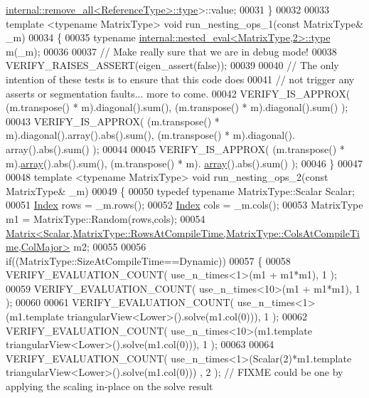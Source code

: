 \begin{DoxyCode}
      \hyperlink{group___sparse_core___module}{internal::remove\_all<ReferenceType>::type}>::value;
00031 \}
00032 
00033 \textcolor{keyword}{template} <\textcolor{keyword}{typename} MatrixType> \textcolor{keywordtype}{void} run\_nesting\_ops\_1(\textcolor{keyword}{const} MatrixType& \_m)
00034 \{
00035   \textcolor{keyword}{typename} \hyperlink{class_eigen_1_1internal_1_1_tensor_lazy_evaluator_writable}{internal::nested\_eval<MatrixType,2>::type} m(\_m);
00036 
00037   \textcolor{comment}{// Make really sure that we are in debug mode!}
00038   VERIFY\_RAISES\_ASSERT(eigen\_assert(\textcolor{keyword}{false}));
00039 
00040   \textcolor{comment}{// The only intention of these tests is to ensure that this code does}
00041   \textcolor{comment}{// not trigger any asserts or segmentation faults... more to come.}
00042   VERIFY\_IS\_APPROX( (m.transpose() * m).diagonal().sum(), (m.transpose() * m).diagonal().sum() );
00043   VERIFY\_IS\_APPROX( (m.transpose() * m).diagonal().array().abs().sum(), (m.transpose() * m).diagonal().
      array().abs().sum() );
00044 
00045   VERIFY\_IS\_APPROX( (m.transpose() * m).\hyperlink{class_eigen_1_1array}{array}().abs().sum(), (m.transpose() * m).
      \hyperlink{class_eigen_1_1array}{array}().abs().sum() );
00046 \}
00047 
00048 \textcolor{keyword}{template} <\textcolor{keyword}{typename} MatrixType> \textcolor{keywordtype}{void} run\_nesting\_ops\_2(\textcolor{keyword}{const} MatrixType& \_m)
00049 \{
00050   \textcolor{keyword}{typedef} \textcolor{keyword}{typename} MatrixType::Scalar Scalar;
00051   \hyperlink{namespace_eigen_a62e77e0933482dafde8fe197d9a2cfde}{Index} rows = \_m.rows();
00052   \hyperlink{namespace_eigen_a62e77e0933482dafde8fe197d9a2cfde}{Index} cols = \_m.cols();
00053   MatrixType m1 = MatrixType::Random(rows,cols);
00054   
      \hyperlink{group___core___module_class_eigen_1_1_matrix}{Matrix<Scalar,MatrixType::RowsAtCompileTime,MatrixType::ColsAtCompileTime,ColMajor>}
       m2;
00055 
00056   \textcolor{keywordflow}{if}((MatrixType::SizeAtCompileTime==Dynamic))
00057   \{
00058     VERIFY\_EVALUATION\_COUNT( use\_n\_times<1>(m1 + m1*m1), 1 );
00059     VERIFY\_EVALUATION\_COUNT( use\_n\_times<10>(m1 + m1*m1), 1 );
00060 
00061     VERIFY\_EVALUATION\_COUNT( use\_n\_times<1>(m1.template triangularView<Lower>().solve(m1.col(0))), 1 );
00062     VERIFY\_EVALUATION\_COUNT( use\_n\_times<10>(m1.template triangularView<Lower>().solve(m1.col(0))), 1 );
00063 
00064     VERIFY\_EVALUATION\_COUNT( use\_n\_times<1>(Scalar(2)*m1.template triangularView<Lower>().solve(m1.col(0)))
      , 2 ); \textcolor{comment}{// FIXME could be one by applying the scaling in-place on the solve result}

\end{DoxyCode}
